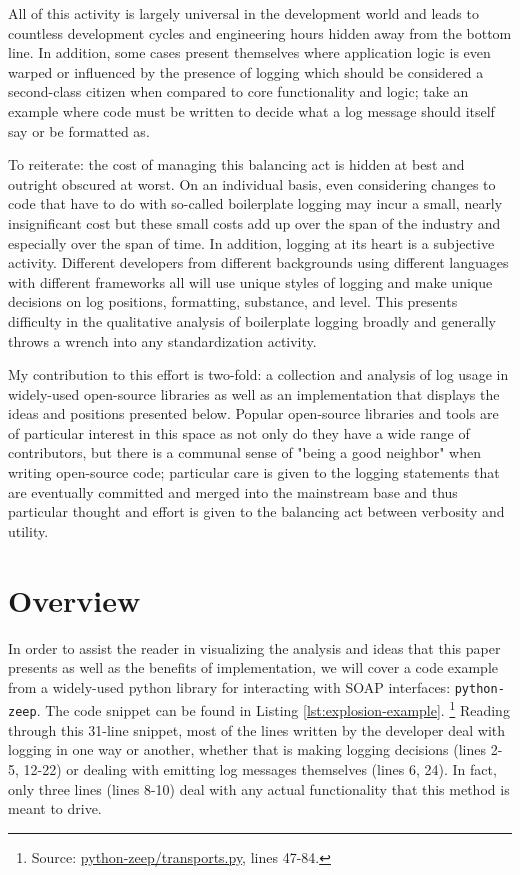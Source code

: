\documentclass[acmsmall,review,authorversion]{acmart}
\begin{document}
    All of this activity is largely universal in the development world and leads to countless development cycles and engineering hours hidden away from the bottom line. In addition, some cases present themselves where application logic is even warped or influenced by the presence of logging which should be considered a second-class citizen when compared to core functionality and logic; take an example where code must be written to decide what a log message should itself say or be formatted as.
    
    To reiterate: the cost of managing this balancing act is hidden at best and outright obscured at worst. On an individual basis, even considering changes to code that have to do with so-called boilerplate logging may incur a small, nearly insignificant cost but these small costs add up over the span of the industry and especially over the span of time. In addition, logging at its heart is a subjective activity. Different developers from different backgrounds using different languages with different frameworks all will use unique styles of logging and make unique decisions on log positions, formatting, substance, and level. This presents difficulty in the qualitative analysis of boilerplate logging broadly and generally throws a wrench into any standardization activity.
    
    My contribution to this effort is two-fold: a collection and analysis of log usage in widely-used open-source libraries as well as an implementation that displays the ideas and positions presented below. Popular open-source libraries and tools are of particular interest in this space as not only do they have a wide range of contributors, but there is a communal sense of "being a good neighbor" when writing open-source code; particular care is given to the logging statements that are eventually committed and merged into the mainstream base and thus particular thought and effort is given to the balancing act between verbosity and utility.

\section{Overview}

    In order to assist the reader in visualizing the analysis and ideas that this paper presents as well as the benefits of implementation, we will cover a code example from a widely-used python library for interacting with SOAP interfaces: \lstinline{python-zeep}. The code snippet can be found in Listing \ref{lst:explosion-example}. \footnote{Source: \href{https://github.com/mvantellingen/python-zeep/blob/4df383021e31372c111bc26cbf2e4535deaee04e/src/zeep/transports.py\#L47}{python-zeep/transports.py}, lines 47-84.} Reading through this 31-line snippet, most of the lines written by the developer deal with logging in one way or another, whether that is making logging decisions (lines 2-5, 12-22) or dealing with emitting log messages themselves (lines 6, 24). In fact, only three lines (lines 8-10) deal with any actual functionality that this method is meant to drive. 
    
\end{document}

